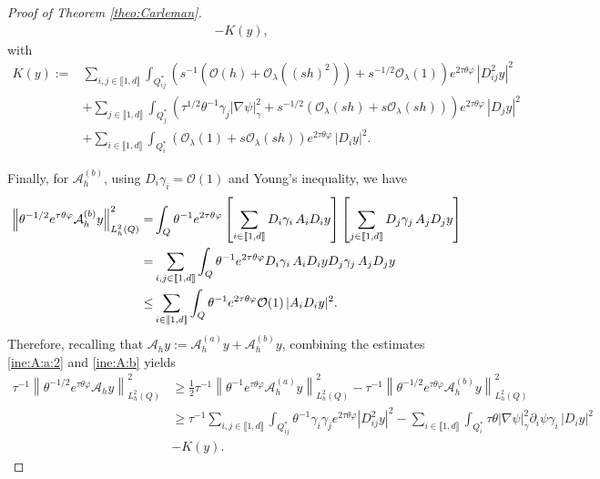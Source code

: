 \documentclass{amsart}
\numberwithin{equation}{section}
\begin{document}
\begin{proof}[Proof of Theorem \ref{theo:Carleman}]
\begin{equation}
\begin{aligned}
        &-K(y),
           \end{aligned}
\end{equation}
with
\begin{align*}
    K(y):= &\sum_{i,j\in\llbracket 1,d\rrbracket}\int_{Q_{ij}^{\ast}}\left(s^{-1}(\mathcal{O}(h)+\mathcal{O}_{\lambda}((sh)^{2}))+s^{-1/2}\mathcal{O}_{\lambda}(1)\right)e^{2\tau\theta\varphi}\,|D_{ij}^{2}y|^{2}\\
    &+\sum_{j\in\llbracket 1,d\rrbracket}\int_{Q_{j}^{\ast}}\left(\tau^{1/2}\theta^{-1}\gamma_{j} |\nabla\psi|_{\gamma}^{2}+s^{-1/2}(\mathcal{O}_{\lambda}(sh)+s\mathcal{O}_{\lambda}(sh))\right)e^{2\tau\theta\varphi}\,|D_{j}y|^{2}\\
    &+\sum_{i\in\llbracket 1,d\rrbracket}\int_{Q_{i}^{\ast}} \left( \mathcal{O}_{\lambda}(1)+s\mathcal{O}_{\lambda}(sh)\right)e^{2\tau\theta\varphi}\,|D_{i}y|^{2}.
\end{align*}

Finally, for $\mathcal{A}_{h}^{(b)}$, using $D_{i}\gamma_{i}=\mathcal{O}(1)$ and Young's inequality, we have
\begin{align}\label{ine:A:b}
   \left\| \theta^{-1/2}e^{\tau\theta\varphi}\mathcal{A}_{h}^{(b)}y\right\|^{2}_{L_{h}^{2}(Q)} =&\int_{Q}\theta^{-1}e^{2\tau\theta\varphi}\left[\sum_{i\in\llbracket 1,d\rrbracket} D_{i}\gamma_{i}\,A_{i}D_{i}y\right]\left[\sum_{j\in\llbracket 1,d\rrbracket} D_{j}\gamma_{j}\,A_{j}D_{j}y\right]\notag\\
=&\sum_{i,j\in\llbracket 1,d\rrbracket}\int_{Q}\theta^{-1}e^{2\tau\theta\varphi} D_{i}\gamma_{i}\,A_{i}D_{i}y D_{j}\gamma_{j}\,A_{j}D_{j}y\notag\\
\leq & \sum_{i\in\llbracket 1,d\rrbracket}\int_{Q}\theta^{-1}e^{2\tau\theta\varphi} \mathcal{O}(1)\,|A_{i}D_{i}y|^{2}.
\end{align}
Therefore, recalling that $\mathcal{A}_{h}y:= \mathcal{A}_{h}^{(a)}y+\mathcal{A}_{h}^{(b)}y$, combining the estimates \eqref{ine:A:a:2} and \eqref{ine:A:b} yields
\begin{align*}
    \tau^{-1}\left\| \theta^{-1/2}e^{\tau\theta\varphi}\mathcal{A}_{h}y\right\|^{2}_{L_{h}^{2}(Q)}
     &\geq\frac{1}{2}\tau^{-1}\left\| \theta^{-1}e^{\tau\theta\varphi}\mathcal{A}_{h}^{(a)}y\right\|^{2}_{L_{h}^{2}(Q)}-\tau^{-1}\left\|\theta^{-1/2}e^{\tau\theta\varphi}\mathcal{A}_{h}^{(b)}y\right\|^{2}_{L_{h}^{2}(Q)}\\
     &\geq \tau^{-1}\sum_{i,j\in\llbracket 1,d\rrbracket}\int_{Q_{ij}^{\ast}} \theta^{-1}\gamma_{i}\gamma_{j}e^{2\tau\theta\varphi}|D^{2}_{ij}y|^{2}-\sum_{i\in\llbracket 1,d\rrbracket}\int_{Q_{i}^{\ast}} \tau\theta|\nabla\psi|^{2}_{\gamma}\partial_{i}\psi\gamma_{i}\,|D_{i}y|^{2}\\
     &-K(y).
\end{align*}


\end{proof}
\end{document}

